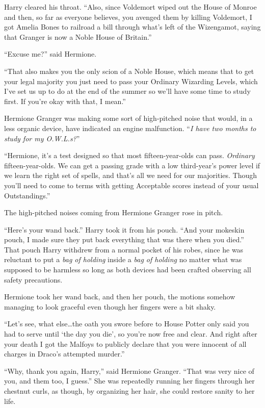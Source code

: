 Harry cleared his throat. “Also, since Voldemort wiped out the House of Monroe and then, so far as everyone believes, you avenged them by killing Voldemort, I got Amelia Bones to railroad a bill through what’s left of the Wizengamot, saying that Granger is now a Noble House of Britain.”

“Excuse me?” said Hermione.

“That also makes you the only scion of a Noble House, which means that to get your legal majority you just need to pass your Ordinary Wizarding Levels, which I’ve set us up to do at the end of the summer so we’ll have some time to study first. If you’re okay with that, I mean.”

Hermione Granger was making some sort of high-pitched noise that would, in a less organic device, have indicated an engine malfunction. “\emph{I have two months to study for my O.W.L.s?}”

“Hermione, it’s a test designed so that most fifteen-year-olds can pass. \emph{Ordinary} fifteen-year-olds. We can get a passing grade with a low third-year’s power level if we learn the right set of spells, and that’s all we need for our majorities. Though you’ll need to come to terms with getting Acceptable scores instead of your usual Outstandings.”

The high-pitched noises coming from Hermione Granger rose in pitch.

“Here’s your wand back.” Harry took it from his pouch. “And your mokeskin pouch, I made sure they put back everything that was there when you died.” That pouch Harry withdrew from a normal pocket of his robes, since he was reluctant to put a \emph{bag of holding} inside a \emph{bag of holding} no matter what was supposed to be harmless so long as both devices had been crafted observing all safety precautions.

Hermione took her wand back, and then her pouch, the motions somehow managing to look graceful even though her fingers were a bit shaky.

“Let’s see, what else…the oath you swore before to House Potter only said you had to serve until ‘the day you die’, so you’re now free and clear. And right after your death I got the Malfoys to publicly declare that you were innocent of all charges in Draco’s attempted murder.”

“Why, thank you again, Harry,” said Hermione Granger. “That was very nice of you, and them too, I guess.” She was repeatedly running her fingers through her chestnut curls, as though, by organizing her hair, she could restore sanity to her life.

